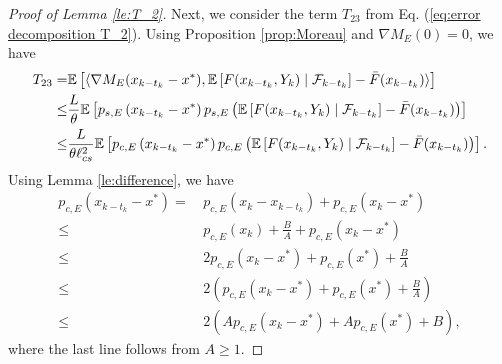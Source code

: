 \documentclass[11 pt]{article}
\begin{document}
\begin{proof}[Proof of Lemma \ref{le:T_2}]
		Next, we consider the term $T_{23}$ from Eq. (\ref{eq:error decomposition T_2}). Using Proposition \ref{prop:Moreau} and $\nabla M_E(0) = 0$, we have
		\begin{align*}
			T_{23}
			= & \mathbb{E}\left[\langle\nabla M_E(x_{k-t_k}-x^*), \mathbb{E}\left[F(x_{k-t_k},Y_k) \mid \mathcal{F}_{k-t_k} \right]-\Bar{F}(x_{k-t_k}) \rangle\right] \\
			\leq &\frac{L}{\theta} \mathbb{E}\left[p_{s,E}\left(x_{k-t_k}-x^*\right) p_{s,E}\left(\mathbb{E}\left[F(x_{k-t_k},Y_k)\mid \mathcal{F}_{k-t_k}\right]-\Bar{F}(x_{k-t_k})\right)\right]\\
			\leq &\frac{L}{\theta \ell_{cs}^2} \mathbb{E}\left[p_{c,E}\left(x_{k-t_k}-x^*\right) p_{c,E}\left(\mathbb{E}\left[F(x_{k-t_k},Y_k)\mid \mathcal{F}_{k-t_k}\right]-\Bar{F}(x_{k-t_k})\right)\right].
		\end{align*}
		Using Lemma \ref{le:difference}, we have
		\begin{align*}
			p_{c,E}(x_{k-t_k}-x^*)=\,&p_{c,E}(x_k-x_{k-t_k})+p_{c,E}(x_k-x^*)\\
			\leq \,&p_{c,E}(x_k)+\frac{B}{A}+p_{c,E}(x_k-x^*)\\
			\leq \,&2p_{c,E}(x_k-x^*)+p_{c,E}(x^*)+\frac{B}{A}\\
			\leq \,&2\left(p_{c,E}(x_k-x^*)+p_{c,E}(x^*)+\frac{B}{A}\right)\\
			\leq \,&2\left(Ap_{c,E}(x_k-x^*)+Ap_{c,E}(x^*)+B\right),
		\end{align*}
		where the last line follows from $A\geq 1$.
		

\end{proof}
\end{document}
